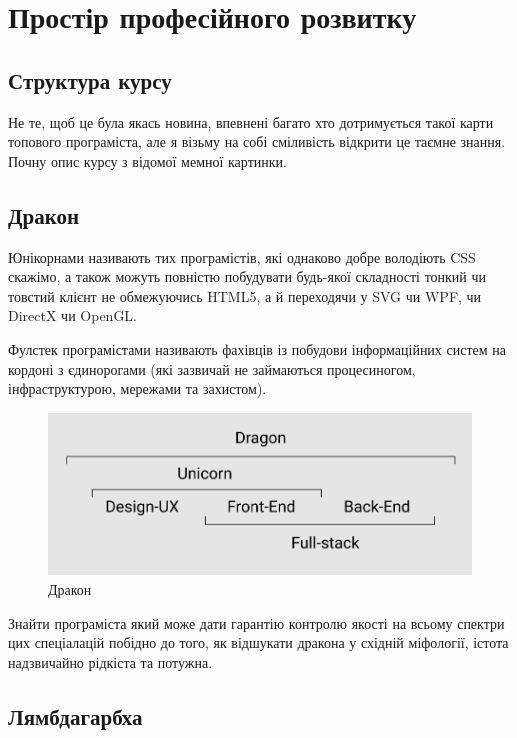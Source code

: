\section{Простір професійного розвитку}

\subsection{Структура курсу}

Не те, щоб це була якась новина, впевнені багато
хто дотримується такої карти топового програміста,
але я візьму на собі сміливість відкрити це таємне
знання. Почну опис курсу з відомої мемної картинки.


\subsection{Дракон}

Юнікорнами називають тих програмістів, які однаково
добре володіють CSS скажімо, а також можуть повністю
побудувати будь-якої складності тонкий чи товстий
клієнт не обмежуючись HTML5, а й переходячи у SVG
чи WPF, чи DirectX чи OpenGL.

Фулстек програмістами називають фахівців із
побудови інформаційних систем на кордоні з
єдинорогами (які зазвичай не займаються процесиногом,
інфраструктурою, мережами та захистом).

\begin{figure}[!htbp]
\centerline{\includegraphics[scale=0.35]{dragon.PNG}}
\caption{Дракон}
\end{figure}

Знайти програміста який може дати гарантію контролю якості
на всьому спектри цих спеціалацій побідно до того, як відшукати
дракона у східній міфології, істота надзвичайно рідкіста та потужна.

\subsection{Лямбдагарбха}

